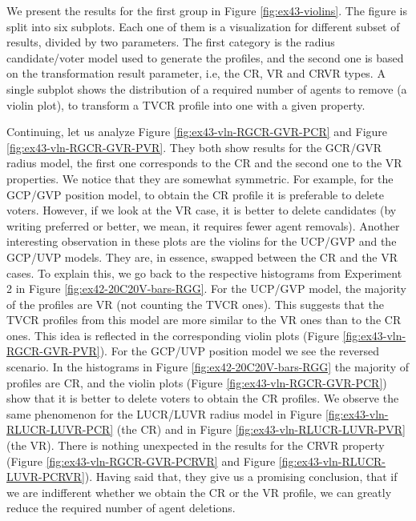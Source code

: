 We present the results for the first group in Figure \ref{fig:ex43-violins}.
The figure is split into six subplots. 
Each one of them is a visualization for different subset of results, divided by two parameters.
The first category is the radius candidate/voter model used to generate the profiles, 
and the second one is based on the transformation result parameter, i.e, the CR, VR and CRVR types.
A single subplot shows the distribution of a required number of agents to remove (a violin plot),
to transform a TVCR profile into one with a given property.

Continuing, let us analyze Figure \ref{fig:ex43-vln-RGCR-GVR-PCR} and Figure \ref{fig:ex43-vln-RGCR-GVR-PVR}.
They both show results for the GCR/GVR radius model, 
the first one corresponds to the CR and the second one to the VR properties.
We notice that they are somewhat symmetric. 
For example, for the GCP/GVP position model, to obtain the CR profile it is preferable to delete voters.
However, if we look at the VR case, it is better to delete candidates (by writing preferred or better, we mean, it requires fewer agent removals).
Another interesting observation in these plots are the violins for the UCP/GVP and the GCP/UVP models.
They are, in essence, swapped between the CR and the VR cases.
To explain this, we go back to the respective histograms from Experiment 2 in Figure \ref{fig:ex42-20C20V-bars-RGG}.
For the UCP/GVP model, the majority of the profiles are VR (not counting the TVCR ones).
This suggests that the TVCR profiles from this model are more similar to the VR ones than to the CR ones.
This idea is reflected in the corresponding violin plots (Figure \ref{fig:ex43-vln-RGCR-GVR-PVR}).
For the GCP/UVP position model we see the reversed scenario.
In the histograms in Figure \ref{fig:ex42-20C20V-bars-RGG} the majority of profiles are CR,
and the violin plots (Figure \ref{fig:ex43-vln-RGCR-GVR-PCR}) show that it is better to delete voters to obtain the CR profiles.
We observe the same phenomenon for the LUCR/LUVR radius model in Figure \ref{fig:ex43-vln-RLUCR-LUVR-PCR} (the CR)
and in Figure \ref{fig:ex43-vln-RLUCR-LUVR-PVR} (the VR).
There is nothing unexpected in the results for the CRVR property (Figure \ref{fig:ex43-vln-RGCR-GVR-PCRVR} and Figure \ref{fig:ex43-vln-RLUCR-LUVR-PCRVR}).
Having said that, they give us a promising conclusion,
that if we are indifferent whether we obtain the CR or the VR profile, we can greatly reduce the required number of agent deletions. 

